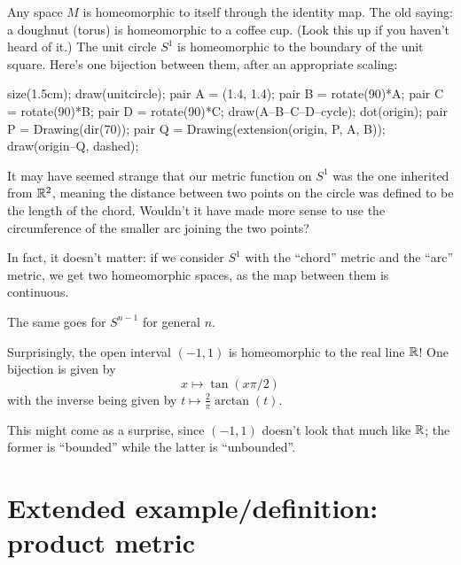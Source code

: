 \begin{example}
	\listhack
	\begin{enumerate}[(a)]
		\ii Any space $M$ is homeomorphic to itself
		through the identity map.
		\ii The old saying: a doughnut (torus) is
		homeomorphic to a coffee cup.
		(Look this up if you haven't heard of it.)
		\ii The unit circle $S^1$ is homeomorphic
		to the boundary of the unit square.
		Here's one bijection between them, after an appropriate scaling:
		\begin{center}
			\begin{asy}
				size(1.5cm);
				draw(unitcircle);
				pair A = (1.4, 1.4);
				pair B = rotate(90)*A;
				pair C = rotate(90)*B;
				pair D = rotate(90)*C;
				draw(A--B--C--D--cycle);
				dot(origin);
				pair P = Drawing(dir(70));
				pair Q = Drawing(extension(origin, P, A, B));
				draw(origin--Q, dashed);
			\end{asy}
		\end{center}
	\end{enumerate}
\end{example}
\begin{example}
	It may have seemed strange that our metric function on $S^1$
	was the one inherited from $\mathbb R^2$,
	meaning the distance between two points
	on the circle was defined to be the length of the chord.
	Wouldn't it have made more sense to use the circumference of the
	smaller arc joining the two points?

	In fact, it doesn't matter:
	if we consider $S^1$ with the ``chord'' metric
	and the ``arc'' metric, we get two homeomorphic spaces,
	as the map between them is continuous.

	The same goes for $S^{n-1}$ for general $n$.
\end{example}

\begin{example}
	Surprisingly, the open interval $(-1,1)$
	is homeomorphic to the real line $\mathbb R$!
	One bijection is given by
	\[ x \mapsto \tan(x \pi/2) \]
	with the inverse being given by $t \mapsto \frac2\pi \arctan(t)$.

	This might come as a surprise,
	since $(-1,1)$ doesn't look that much like $\mathbb R$;
	the former is ``bounded'' while the latter is ``unbounded''.
\end{example}

\section{Extended example/definition: product metric}

